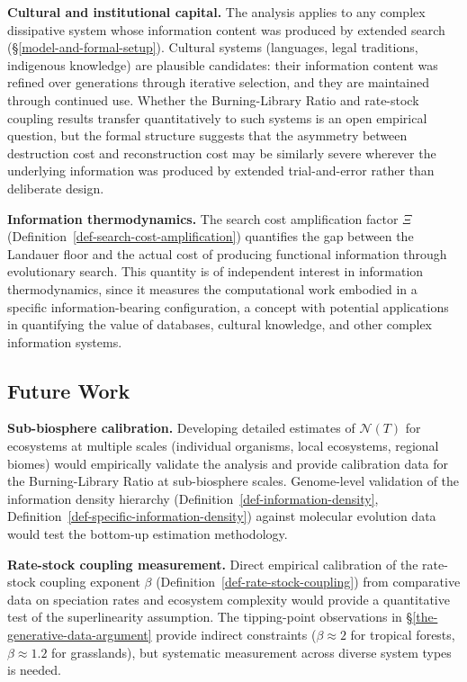 \documentclass[11pt]{article}
\theoremstyle{plain}
\theoremstyle{definition}
\theoremstyle{remark}
\let\origsubsection\subsection
\renewcommand{\subsection}{\needspace{7\baselineskip}\origsubsection}
\begin{document}
\textbf{Cultural and institutional capital.} The analysis applies to any
complex dissipative system whose information content was produced by
extended search (§\ref{model-and-formal-setup}). Cultural systems
(languages, legal traditions, indigenous knowledge) are plausible
candidates: their information content was refined over generations
through iterative selection, and they are maintained through continued
use. Whether the Burning-Library Ratio and rate-stock coupling results
transfer quantitatively to such systems is an open empirical question,
but the formal structure suggests that the asymmetry between destruction
cost and reconstruction cost may be similarly severe wherever the
underlying information was produced by extended trial-and-error rather
than deliberate design.

\textbf{Information thermodynamics.} The search cost amplification
factor \(\Xi\) (Definition~\ref{def-search-cost-amplification})
quantifies the gap between the Landauer floor and the actual cost of
producing functional information through evolutionary search. This
quantity is of independent interest in information thermodynamics, since
it measures the computational work embodied in a specific
information-bearing configuration, a concept with potential applications
in quantifying the value of databases, cultural knowledge, and other
complex information systems.

\subsection{Future Work}\label{future-work}

\textbf{Sub-biosphere calibration.} Developing detailed estimates of
\(\mathcal{N}(T)\) for ecosystems at multiple scales (individual
organisms, local ecosystems, regional biomes) would empirically validate
the analysis and provide calibration data for the Burning-Library Ratio
at sub-biosphere scales. Genome-level validation of the information
density hierarchy (Definition~\ref{def-information-density},
Definition~\ref{def-specific-information-density}) against molecular
evolution data would test the bottom-up estimation methodology.

\textbf{Rate-stock coupling measurement.} Direct empirical calibration
of the rate-stock coupling exponent \(\beta\)
(Definition~\ref{def-rate-stock-coupling}) from comparative data on
speciation rates and ecosystem complexity would provide a quantitative
test of the superlinearity assumption. The tipping-point observations in
§\ref{the-generative-data-argument} provide indirect constraints
(\(\beta \approx 2\) for tropical forests, \(\beta \approx 1.2\) for
grasslands), but systematic measurement across diverse system types is
needed.
\end{document}
